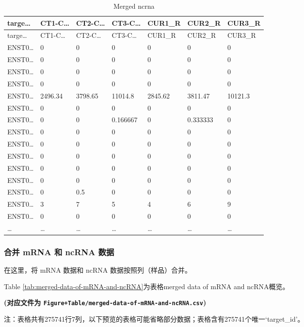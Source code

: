 \documentclass[
]{article}
\begin{document}
\begin{longtable}[]{@{}lllllll@{}}
\caption{\label{tab:merged-ncrna}Merged ncrna}\tabularnewline
\toprule
targe\ldots{} & CT1-C\ldots{} & CT2-C\ldots{} & CT3-C\ldots{} & CUR1\_R & CUR2\_R & CUR3\_R\tabularnewline
\midrule
\endfirsthead
\toprule
targe\ldots{} & CT1-C\ldots{} & CT2-C\ldots{} & CT3-C\ldots{} & CUR1\_R & CUR2\_R & CUR3\_R\tabularnewline
\midrule
\endhead
ENST0\ldots{} & 0 & 0 & 0 & 0 & 0 & 0\tabularnewline
ENST0\ldots{} & 0 & 0 & 0 & 0 & 0 & 0\tabularnewline
ENST0\ldots{} & 0 & 0 & 0 & 0 & 0 & 0\tabularnewline
ENST0\ldots{} & 0 & 0 & 0 & 0 & 0 & 0\tabularnewline
ENST0\ldots{} & 2496.34 & 3798.65 & 11014.8 & 2845.62 & 3811.47 & 10121.3\tabularnewline
ENST0\ldots{} & 0 & 0 & 0 & 0 & 0 & 0\tabularnewline
ENST0\ldots{} & 0 & 0 & 0.166667 & 0 & 0.333333 & 0\tabularnewline
ENST0\ldots{} & 0 & 0 & 0 & 0 & 0 & 0\tabularnewline
ENST0\ldots{} & 0 & 0 & 0 & 0 & 0 & 0\tabularnewline
ENST0\ldots{} & 0 & 0 & 0 & 0 & 0 & 0\tabularnewline
ENST0\ldots{} & 0 & 0 & 0 & 0 & 0 & 0\tabularnewline
ENST0\ldots{} & 0 & 0 & 0 & 0 & 0 & 0\tabularnewline
ENST0\ldots{} & 0 & 0.5 & 0 & 0 & 0 & 0\tabularnewline
ENST0\ldots{} & 3 & 7 & 5 & 4 & 6 & 9\tabularnewline
ENST0\ldots{} & 0 & 0 & 0 & 0 & 0 & 0\tabularnewline
\ldots{} & \ldots{} & \ldots{} & \ldots{} & \ldots{} & \ldots{} & \ldots{}\tabularnewline
\bottomrule
\end{longtable}

\hypertarget{ux5408ux5e76-mrna-ux548c-ncrna-ux6570ux636e}{%
\subsubsection{合并 mRNA 和 ncRNA 数据}\label{ux5408ux5e76-mrna-ux548c-ncrna-ux6570ux636e}}

在这里，将 mRNA 数据和 ncRNA 数据按照列（样品）合并。

Table \ref{tab:merged-data-of-mRNA-and-ncRNA}为表格merged data of mRNA and ncRNA概览。

\textbf{(对应文件为 \texttt{Figure+Table/merged-data-of-mRNA-and-ncRNA.csv})}

\begin{center}\begin{tcolorbox}[colback=gray!10, colframe=gray!50, width=0.9\linewidth, arc=1mm, boxrule=0.5pt]注：表格共有275741行7列，以下预览的表格可能省略部分数据；表格含有275741个唯一`target\_id'。
\end{tcolorbox}
\end{center}
\end{document}
